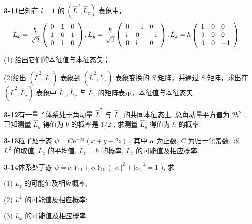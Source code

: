 \vfill

\newpage
\vfill

\noindent
\textbf{3-11}\quad 已知在 $l = 1$ 的 $\left(\hat{L}^2, \hat{L}_z\right)$ 表象中，
$$
\hat {L} _ {x} = \frac {\hbar}{\sqrt {2}} \left( \begin{array}{l l l} 0 & 1 & 0 \\ 1 & 0 & 1 \\ 0 & 1 & 0 \end{array} \right), \hat {L} _ {y} = \frac {\hbar}{\sqrt {2}} \left( \begin{array}{l l l} 0 & - \mathrm{i} & 0 \\ \mathrm{i} & 0 & - \mathrm{i} \\ 0 & \mathrm{i} & 0 \end{array} \right), \hat {L} _ {z} = \hbar \left( \begin{array}{l l l} 1 & 0 & 0 \\ 0 & 0 & 0 \\ 0 & 0 & - 1 \end{array} \right)
$$

(1) 给出它们的本征值与本征态矢；

(2)给出 $(\hat{L}^2, \hat{L}_z)$ 表象到 $(\hat{L}^2, \hat{L}_x)$ 表象变换的 $S$ 矩阵，并通过 $S$ 矩阵，求出在 $(\hat{L}^2, \hat{L}_x)$ 表象中 $\hat{L}_x, \hat{L}_y$ 与 $\hat{L}_z$ 的矩阵表示，本征值与本征态矢.

\vfill

\newpage
\vfill

\noindent
\textbf{3-12}\quad 有一量子体系处于角动量 $\hat{L}^2$ 与 $\hat{L}_z$ 的共同本征态上, 总角动量平方值为 $2\hbar^2$ . 已知测量 $\hat{L}_y$ 得值为 0 的概率是 $1/2$ , 求测量 $\hat{L}_y$ 得值为 $\hbar$ 的概率.

\vfill

\newpage
\vfill

\noindent
\textbf{3-13}\quad 粒子处于态 $\psi = C\mathrm{e}^{-\alpha r}(x + y + 2z)$ , 其中 $\alpha$ 为正数, $C$ 为归一化常数. 求 $L^2$ 的取值, $L_z$ 的平均值, $L_z = \hbar$ 的概率, $L_x$ 的可能值及相应概率.

\vfill

\newpage
\vfill

\noindent
\textbf{3-14}\quad 体系处于态 $\psi = c_{1}Y_{11} + c_{2}Y_{10}$ ( $|c_1|^2 + |c_2|^2 = 1$ ), 求

(1) $L_{z}$ 的可能值及相应概率; 

(2) $L^{2}$ 的可能值及相应概率; 

(3) $L_{x}$ 的可能值及相应概率.

